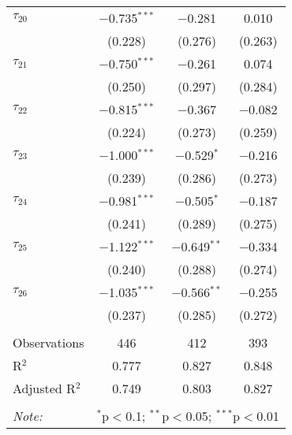 \begin{tabular}{@{\extracolsep{5pt}}lccc}
 $\tau_{20}$ & $-$0.735$^{***}$ & $-$0.281 & 0.010 \\ 
  & (0.228) & (0.276) & (0.263) \\ 
   
 $\tau_{21}$ & $-$0.750$^{***}$ & $-$0.261 & 0.074 \\ 
  & (0.250) & (0.297) & (0.284) \\ 
   
 $\tau_{22}$ & $-$0.815$^{***}$ & $-$0.367 & $-$0.082 \\ 
  & (0.224) & (0.273) & (0.259) \\ 
   
 $\tau_{23}$ & $-$1.000$^{***}$ & $-$0.529$^{*}$ & $-$0.216 \\ 
  & (0.239) & (0.286) & (0.273) \\ 
   
 $\tau_{24}$ & $-$0.981$^{***}$ & $-$0.505$^{*}$ & $-$0.187 \\ 
  & (0.241) & (0.289) & (0.275) \\ 
   
 $\tau_{25}$ & $-$1.122$^{***}$ & $-$0.649$^{**}$ & $-$0.334 \\ 
  & (0.240) & (0.288) & (0.274) \\ 
   
 $\tau_{26}$ & $-$1.035$^{***}$ & $-$0.566$^{**}$ & $-$0.255 \\ 
  & (0.237) & (0.285) & (0.272) \\ 
   
\hline \\[-1.8ex] 
Observations & 446 & 412 & 393 \\ 
R$^{2}$ & 0.777 & 0.827 & 0.848 \\ 
Adjusted R$^{2}$ & 0.749 & 0.803 & 0.827 \\ 
\hline 
\hline \\[-1.8ex] 
\textit{Note:}  & \multicolumn{3}{r}{$^{*}$p$<$0.1; $^{**}$p$<$0.05; $^{***}$p$<$0.01} \\ 
\end{tabular} 